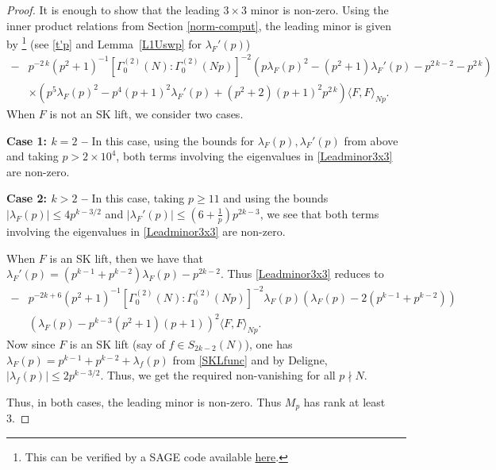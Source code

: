 \documentclass[11pt]{amsart}
\numberwithin{equation}{section}
\theoremstyle{plain}
\theoremstyle{definition}
\newcommand{\lemref}[1]{Lemma~\ref{#1}}
\newcommand{\lan}{\langle }
\newcommand{\ran}{\rangle}
\begin{document}
\begin{proof}
It is enough to show that the leading $3 \times 3$ minor is non-zero. Using the inner product relations from Section \ref{norm-comput}, the leading minor is given by \footnote{This can be verified by a SAGE code available \href{https://drive.google.com/file/d/1tRieixIu2tMX_geLfEpXOBl5sX7ETpdJ/view?usp=drive_link}{here}.} (see \eqref{t'p} and \lemref{L1Uswp} for $\lambda_F'(p)$)
    \begin{equation}
      \begin{split}\label{Leadminor3x3}
          -&p^{-2 \, k}\left(p^{2} + 1\right)^{-1}[\Gamma_0^{(2)}(N):\Gamma_0^{(2)}(Np)]^{-2}\left(p \lambda_F(p)^{2} - (p^2+1) \lambda_F'(p)- p^{2 \, k-2} - p^{2 \, k }\right)\\
          &\times \left(p^{5} \lambda_F(p)^{2} - p^4(p+1)^2\lambda_F'(p) + \left(p^{2} + 2\right) {\left(p + 1\right)}^{2} p^{2 \, k}\right) \lan F, F\ran_{Np}.
      \end{split}
    \end{equation}
When $F$ is not an SK lift, we consider two cases.

\textbf{Case 1: $k=2$ --} In this case, using the bounds for $\lambda_F(p),\lambda_F'(p)$ from above and taking $p>2\times 10^4$, both terms involving the eigenvalues in \eqref{Leadminor3x3} are non-zero. 

\textbf{Case 2: $k>2$ --} In this case, taking $p\ge 11$ and using the bounds  $|\lambda_F(p)|\le 4 p^{k-3/2}$ and $|\lambda_F'(p)|\le (6+\frac{1}{p}) p^{2k-3}$, we see that both terms involving the eigenvalues in \eqref{Leadminor3x3} are non-zero. 

When $F$ is an SK lift, then we have that $\lambda_F'(p)= (p^{k-1}+p^{k-2})\lambda_F(p)-p^{2k-2}$. Thus \eqref{Leadminor3x3} reduces to
\begin{equation} \label{sk-adv}
    \begin{split}
       -&p^{-2k+6}\left(p^{2} + 1\right)^{-1}[\Gamma_0^{(2)}(N):\Gamma_0^{(2)}(Np)]^{-2} \lambda_F(p)  \left( \lambda_F(p) - 2 (p^{k -1} +p^{k-2})\right)\\
       &\left( \lambda_F(p) - p^{k-3 }(p^2+1)(p+1)\right)^{2}\lan F, F\ran_{Np}.
    \end{split}
\end{equation}
Now since $F$ is an SK lift (say of $f\in S_{2k-2}(N)$), one has $\lambda_F(p)= p^{k-1}+p^{k-2}+\lambda_f(p)$ from \eqref{SKLfunc} and by Deligne, $|\lambda_f(p)|\le 2p^{k-3/2}$. Thus, we get the required non-vanishing for all $p \nmid N$.

Thus, in both cases, the leading minor is non-zero. Thus $M_p$ has rank at least 3.
\end{proof}
\end{document}
